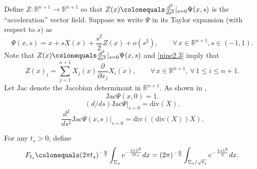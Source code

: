 \documentclass[12pt,reqno]{amsart}
\theoremstyle{definition}
\renewcommand{\subset}{\subseteq}
\newcommand{\vnormt}[1]{\left\|#1\right\|}    %
\newcommand{\R}{\mathbb{R}}
\newcommand{\sdimn}{n}
\newcommand{\adimn}{n+1}
\begin{document}
Define $Z\colon\R^{\adimn}\to\R^{\adimn}$ so that $Z(x)\colonequals\frac{d^{2}}{ds^{2}}|_{s=0}\Psi(x,s)$ is the ``acceleration'' vector field.  Suppose we write $\Psi$ in its Taylor expansion (with respect to $s$) as
\begin{equation}\label{tayloreq}
\Psi(x,s)=x+sX(x)+\frac{s^{2}}{2}Z(x)+o(s^{2}),\qquad\forall\,x\in\R^{\adimn},s\in(-1,1).
\end{equation}
Note that $Z(x)\colonequals\frac{d^{2}}{ds^{2}}|_{s=0}\Psi(x,s)$ and \eqref{nine2.3} imply that
\begin{equation}\label{nine2.5}
Z(x)_{i}=\sum_{j=1}^{\adimn}X_{j}(x)\frac{\partial}{\partial x_{j}}X_{i}(x),\qquad\forall\,x\in\R^{\adimn},\,\forall\,1\leq i\leq \adimn.
\end{equation}
Let $\mathrm{Jac}$ denote the Jacobian determinant in $\R^{\adimn}$.  As shown in \cite[Lemma 12.2]{heilman15}\cite{chokski07},
\begin{equation}\label{Btwo2}
\mathrm{Jac}\Psi(x,0)=1.
\end{equation}
\begin{equation}\label{Btwo3}
(d/ds)\mathrm{Jac}\Psi|_{s=0}=\mathrm{div}(X).
\end{equation}
\begin{equation}\label{Btwo5}
\frac{d^{2}}{ds^{2}}\mathrm{Jac}\Psi(x,s)|_{s=0}=\mathrm{div}((\mathrm{div}(X))X).
\end{equation}



For any $t_{s}>0$, define
$$F_{t_{s}}\colonequals(2\pi t_{s})^{-\frac{\sdimn}{2}}\int_{\Sigma_{s}}e^{-\frac{\vnormt{x}^{2}}{2t_{s}}}dx
=(2\pi)^{-\frac{\sdimn}{2}}\int_{\Sigma_{s}/\sqrt{t_{s}}}e^{-\frac{\vnormt{x}^{2}}{2}}dx.$$
\end{document}
